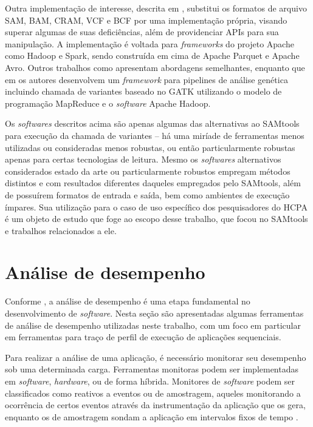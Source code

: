 \documentclass[cic,tc]{iiufrgs}
\begin{document}
Outra implementação de interesse, descrita em \cite{massie2013adam}, substitui
os formatos de arquivo SAM, BAM, CRAM, VCF e BCF por uma implementação própria,
visando superar algumas de suas deficiências, além de providenciar APIs para
sua manipulação. A implementação é voltada para \textit{frameworks} do projeto Apache
como Hadoop e Spark, sendo construída em cima de Apache Parquet e Apache Avro.
Outros trabalhos como \cite{boufea2017managing} apresentam abordagens
semelhantes, enquanto que em \cite{decap2015halvade} os autores desenvolvem um
\textit{framework} para pipelines de análise genética incluindo chamada de variantes
baseado no GATK utilizando o modelo de programação MapReduce e o \textit{software}
Apache Hadoop.

Os \textit{softwares} descritos acima são apenas algumas das alternativas ao SAMtools
para execução da chamada de variantes -- há uma miríade de ferramentas menos
utilizadas ou consideradas menos robustas, ou então particularmente robustas
apenas para certas tecnologias de leitura. Mesmo os \textit{softwares} alternativos
considerados estado da arte ou particularmente robustos empregam métodos
distintos e com resultados diferentes daqueles empregados pelo SAMtools, além
de possuírem formatos de entrada e saída, bem como ambientes de execução
ímpares. Sua utilização para o caso de uso específico dos pesquisadores do HCPA
é um objeto de estudo que foge ao escopo desse trabalho, que focou no SAMtools
e trabalhos relacionados a ele.

\section{Análise de desempenho}
\label{sec:antanal}

Conforme \cite{jain2art}, a análise de desempenho é uma etapa fundamental no
desenvolvimento de \textit{software}. Nesta seção são apresentadas algumas ferramentas
de análise de desempenho utilizadas neste trabalho, com um foco em particular
em ferramentas para traço de perfil de execução de aplicações sequenciais.

Para realizar a análise de uma aplicação, é necessário monitorar seu desempenho
sob uma determinada carga. Ferramentas monitoras podem ser implementadas em
\textit{software}, \textit{hardware}, ou de forma híbrida. Monitores de \textit{software} podem ser
classificados como reativos a eventos ou de amostragem, aqueles monitorando a
ocorrência de certos eventos através da instrumentação da aplicação que os
gera, enquanto os de amostragem sondam a aplicação em intervalos fixos de
tempo \cite{jain2art}.
\end{document}
